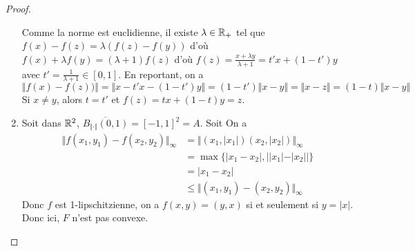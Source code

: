 \begin{proof}
\begin{enumerate}
		Comme la norme est euclidienne, il existe $\lambda\in\mathbb{R}_{+}$ tel que $f(x)-f(z)=\lambda(f(z)-f(y))$ d'où $f(x)+\lambda f(y)=(\lambda+1)f(z)$ d'où $f(z)=\frac{x+\lambda y}{\lambda+1}=t'x+(1-t')y$ avec $t'=\frac{1}{\lambda+1}\in[0,1]$. En reportant, on a 
		\begin{equation}\Vert f(x)-f(z))\Vert=\Vert x-t'x-(1-t')y\Vert=(1-t')\Vert x-y\Vert=\Vert x-z\Vert=(1-t)\Vert x-y\Vert\end{equation}
		Si $x\neq y$, alors $t=t'$ et $f(z)=tx+(1-t)y=z$.

		\item Soit dans $\mathbb{R}^{2}$, $\overline{B_{\Vert\cdot\Vert}(0,1)}=[-1,1]^{2}=A$. Soit 
		On a 
		\begin{align}
			\Vert f(x_{1},y_{1})-f(x_{2},y_{2})\Vert_{\infty}
			&= \Vert (x_{1},\vert x_{1}\vert)(x_{2},\vert x_{2}\vert)\Vert_{\infty}\\
			&=\max\{\vert x_{1}-x_{2}\vert, \bigl\vert\vert x_{1}\vert-\vert x_{2}\vert\bigr\vert\}\\
			&=\vert x_{1}-x_{2}\vert\\
			&\leqslant\Vert (x_{1},y_{1})-(x_{2},y_{2})\Vert_{\infty}
		\end{align}
		Donc $f$ est 1-lipschitzienne, on a $f(x,y)=(y,x)$ si et seulement si $y=\vert x\vert$. Donc ici, $F$ n'est pas convexe.
	\end{enumerate}
\end{proof}

